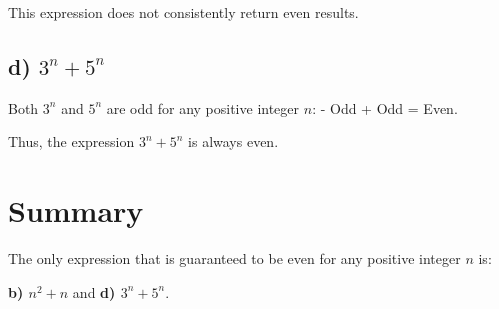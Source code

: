 \documentclass{article}
\begin{document}
This expression does not consistently return even results.

\subsection{d) \( 3^n + 5^n \)}

Both \( 3^n \) and \( 5^n \) are odd for any positive integer \( n \):
- Odd + Odd = Even.

Thus, the expression \( 3^n + 5^n \) is always even.

\section*{Summary}

The only expression that is guaranteed to be even for any positive integer \( n \) is:

\textbf{b) \( n^2 + n \)} and \textbf{d) \( 3^n + 5^n \)}.
\end{document}
